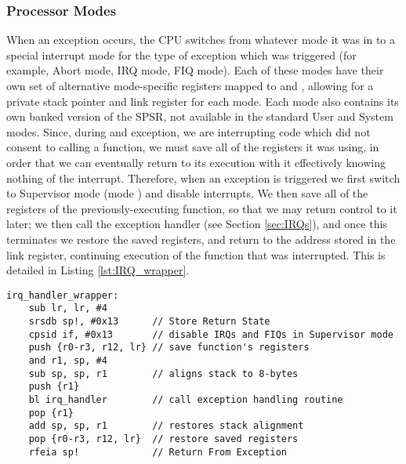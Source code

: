     \subsubsection{Processor Modes}
        \label{sec:CPU_modes}
        When an exception occurs, the CPU switches from whatever mode it was in
        to a special interrupt mode for the type of exception which was
        triggered (for example, Abort mode, IRQ mode, FIQ mode). Each of these
        modes have their own set of alternative mode-specific registers mapped
        to  and  \cite[pg.2-19]{TRM}, allowing for a private
        stack pointer and link register for each mode. Each mode also contains
        its own banked version of the SPSR, not available in the standard User
        and System modes. Since, during and exception, we are interrupting code
        which did not consent to calling a function, we must save all of the
        registers it was using, in order that we can eventually return to its
        execution with it effectively knowing nothing of the interrupt.
        Therefore, when an exception is triggered we first switch to Supervisor
        mode (mode ) and disable interrupts. We then save all of the
        registers of the previously-executing function, so that we may return
        control to it later; we then call the exception handler (see Section
        \ref{sec:IRQs}), and once this terminates we restore the saved
        registers, and return to the address stored in the link register,
        continuing execution of the function that was interrupted. This is
        detailed in Listing \ref{lst:IRQ_wrapper}.

        \lstset{language=c}
        \begin{lstlisting}[caption={The setup and cleanup for dealing with an
        exception},captionpos=b,label={lst:IRQ_wrapper}]
irq_handler_wrapper:
    sub lr, lr, #4      
    srsdb sp!, #0x13      // Store Return State
    cpsid if, #0x13       // disable IRQs and FIQs in Supervisor mode
    push {r0-r3, r12, lr} // save function's registers
    and r1, sp, #4        
    sub sp, sp, r1        // aligns stack to 8-bytes
    push {r1}
    bl irq_handler        // call exception handling routine
    pop {r1}
    add sp, sp, r1        // restores stack alignment
    pop {r0-r3, r12, lr}  // restore saved registers
    rfeia sp!             // Return From Exception
        \end{lstlisting}

